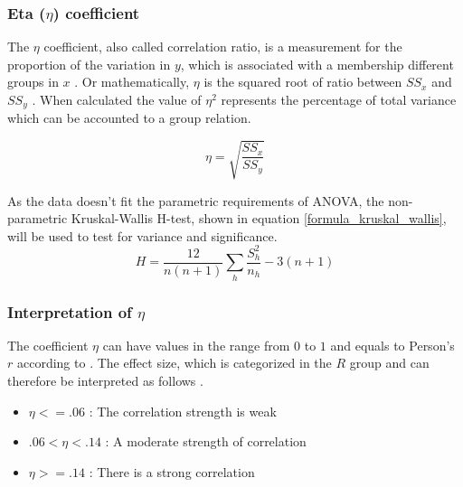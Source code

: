 \documentclass[a4paper,headsepline,footsepline,fontsize=11pt,BCOR=12mm,DIV=12]{report}
\begin{document}
\subsubsection{Eta ($\eta$) coefficient}
The $\eta$ coefficient, also called correlation ratio, is a measurement for the proportion of the variation in $y$, which is associated with a membership different groups in $x$ \cite{Laken2013}. Or mathematically, $\eta$ is the squared root of ratio between $SS_x$ and $SS_y$ \cite{Shaldehi2013,SAGE2014}. When calculated the value of $\eta^2$ represents the percentage of total variance which can be accounted to a group relation.

\smallskip
\begin{equation}
\label{formula_eta}	
	\eta = \sqrt{\frac{SS_x}{SS_y}}
\end{equation}

 As the data doesn't fit the parametric requirements of ANOVA, the non-parametric Kruskal-Wallis H-test, shown in equation \ref{formula_kruskal_wallis}, will be used to test for variance and significance.
\smallskip
\begin{equation}
\label{formula_kruskal_wallis}	
	H = \frac{12}{n(n+1)}\sum_{h}{\frac{S_h^2}{n_h}}-3(n+1)
\end{equation}

\subsubsection{Interpretation of $\eta$}
The coefficient $\eta$ can have values in the range from $0$ to $1$ and equals to Person's $r$ according to \cite{Laken2013}. The effect size, which is categorized in the $R$ group and can therefore be interpreted as follows \cite{Regber2016,Cohen1988}.
\begin{itemize}
	\item $\eta <= .06$ : The correlation strength is weak
	\item $.06 < \eta < .14$ : A moderate strength of correlation
	\item $\eta >= .14$ : There is a strong correlation
\end{itemize}
\end{document}
